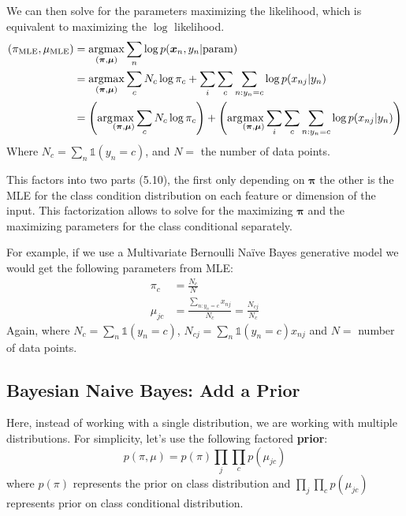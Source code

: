 \documentclass{article}
\renewcommand{\v}{\boldsymbol}
\begin{document}
\smallskip

We can then solve for the parameters maximizing the likelihood, which is equivalent to maximizing the $\log$ likelihood.
\begin{align}
		\left(\pi_{\on{MLE}}, \mu_{\on{MLE}}\right) &= \underset{(\v \pi,\v \mu)}{\on{argmax}} \sum_n \log p(\v x_n , y_n| \text{param})\\
		&= \underset{(\v \pi,\v \mu)}{\on{argmax}} \sum_c N_c \log \pi_c + \sum_i\sum_c\sum_{n:y_n=c}\log p(x_{nj}|y_n)\\
	    &= \left(\arg\!\max_{(\v \pi,\v \mu)} \sum_c N_c \log \pi_c\right) + \left(\arg\!\max_{(\v \pi,\v \mu)} \sum_i\sum_c\sum_{n:y_n=c}\log p(x_{nj}|y_n)\right)
\end{align}
Where $N_c = \sum_n \mathbb{1}(y_n = c)$, and $N =$ the number of data points.

\smallskip

This factors into two parts (5.10), the first only depending on $\v\pi$ the other is the MLE for the class condition distribution on each feature or dimension of the input. This factorization allows to solve for the maximizing $\v\pi$ and the maximizing parameters for the class conditional separately.

\smallskip

For example, if we use a Multivariate Bernoulli Na\"ive Bayes generative model we would get the following parameters from MLE:
\begin{align}
		\pi_c &= \frac{N_c}{N}\\
		\mu_{jc} &= \frac{\sum_{n:y_n=c}x_{nj}}{N_c} = \frac{N_{cj}}{N_c}
\end{align}
Again, where $N_c = \sum_n \mathbb{1}(y_n = c)$, $N_{cj} = \sum_n \mathbb{1}(y_n = c) x_{nj}$ and $N =$ number of data points.\\
\subsection{Bayesian Naive Bayes: Add a Prior}
Here, instead of working with a single distribution, we are working with multiple distributions. For simplicity, let's use the following factored \textbf{prior}:
\[p(\pi, \mu) = p(\pi) \prod_j \prod_c p(\mu_{jc})\] 
where $p(\pi)$ represents the prior on class distribution and $\prod_j \prod_c p(\mu_{jc})$ represents prior on class conditional distribution.

\smallskip
\end{document}
